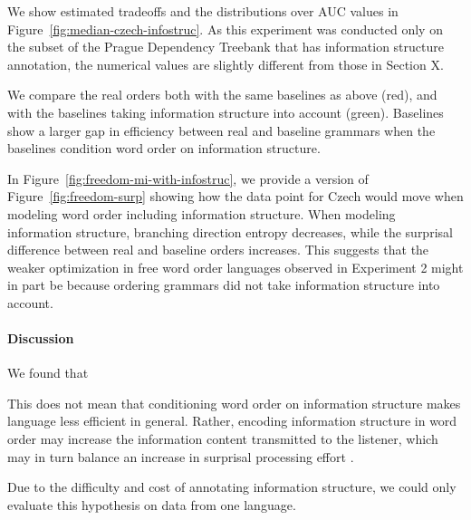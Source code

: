 We show estimated tradeoffs and the distributions over AUC values in Figure~\ref{fig:median-czech-infostruc}.
As this experiment was conducted only on the subset of the Prague Dependency Treebank that has information structure annotation, the numerical values are slightly different from those in Section X.

We compare the real orders both with the same baselines as above (red), and with the baselines taking information structure into account (green).
Baselines show a larger gap in efficiency between real and baseline grammars when the baselines condition word order on information structure.




In Figure~\ref{fig:freedom-mi-with-infostruc}, we provide a version of Figure~\ref{fig:freedom-surp} showing how the data point for Czech would move when modeling word order including information structure.
When modeling information structure, branching direction entropy decreases, while the surprisal difference between real and baseline orders increases.
This suggests that the weaker optimization in free word order languages observed in Experiment 2 might in part be because ordering grammars did not take information structure into account.
	
\paragraph{Discussion}
We found that 
	
This does not mean that conditioning word order on information structure makes language less efficient in general.
Rather, encoding information structure in word order may increase the information content transmitted to the listener, which may in turn balance an increase in surprisal processing effort \citep{hahn2020optimization}.

Due to the difficulty and cost of annotating information structure, we could only evaluate this hypothesis on data from one language.

